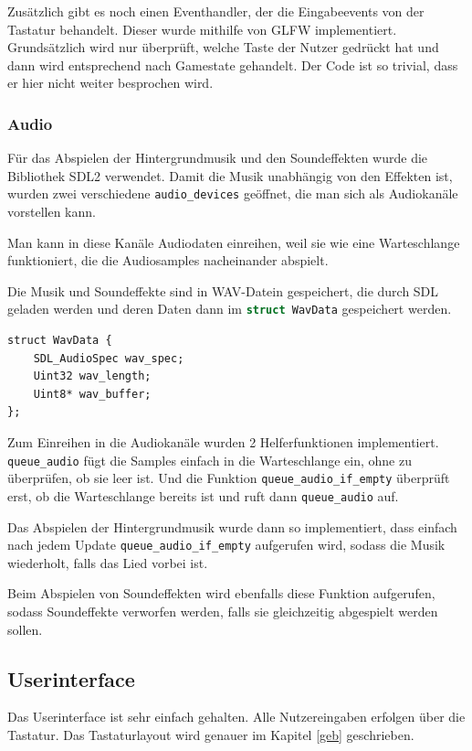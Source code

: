 \documentclass[11pt]{article}
\newcommand{\lstin}[1]{\lstinline[language=C]{#1}}
\begin{document}
Zusätzlich gibt es noch einen Eventhandler, der die Eingabeevents von der Tastatur behandelt. Dieser wurde mithilfe von GLFW implementiert.
Grundsätzlich wird nur überprüft, welche Taste der Nutzer gedrückt hat und dann wird entsprechend nach Gamestate gehandelt.
Der Code ist so trivial, dass er hier nicht weiter besprochen wird.

\subsubsection{Audio}

Für das Abspielen der Hintergrundmusik und den Soundeffekten wurde die Bibliothek SDL2 verwendet.
Damit die Musik unabhängig von den Effekten ist, wurden zwei verschiedene \lstin{audio_devices} geöffnet, die man sich als Audiokanäle vorstellen kann. 

Man kann in diese Kanäle Audiodaten einreihen, weil sie wie eine Warteschlange funktioniert, die die Audiosamples nacheinander abspielt.

Die Musik und Soundeffekte sind in WAV-Datein gespeichert, die durch SDL geladen werden und deren Daten dann im \lstin{struct WavData} gespeichert werden.
\begin{lstlisting}
struct WavData {
    SDL_AudioSpec wav_spec;
    Uint32 wav_length;
    Uint8* wav_buffer;
};
\end{lstlisting}

Zum Einreihen in die Audiokanäle wurden 2 Helferfunktionen implementiert. \lstin{queue_audio} fügt die Samples einfach in die Warteschlange ein, ohne zu überprüfen, ob sie leer ist.
Und die Funktion \lstin{queue_audio_if_empty} überprüft erst, ob die Warteschlange bereits ist und ruft dann \lstin{queue_audio} auf.

Das Abspielen der Hintergrundmusik wurde dann so implementiert, dass einfach nach jedem Update \lstin{queue_audio_if_empty} aufgerufen wird, 
sodass die Musik wiederholt, falls das Lied vorbei ist.

Beim Abspielen von Soundeffekten wird ebenfalls diese Funktion aufgerufen, sodass Soundeffekte verworfen werden, falls sie gleichzeitig abgespielt werden sollen.

\subsection{Userinterface}
Das Userinterface ist sehr einfach gehalten. Alle Nutzereingaben erfolgen über die Tastatur. 
Das Tastaturlayout wird genauer im Kapitel \ref{geb} geschrieben.
\end{document}
